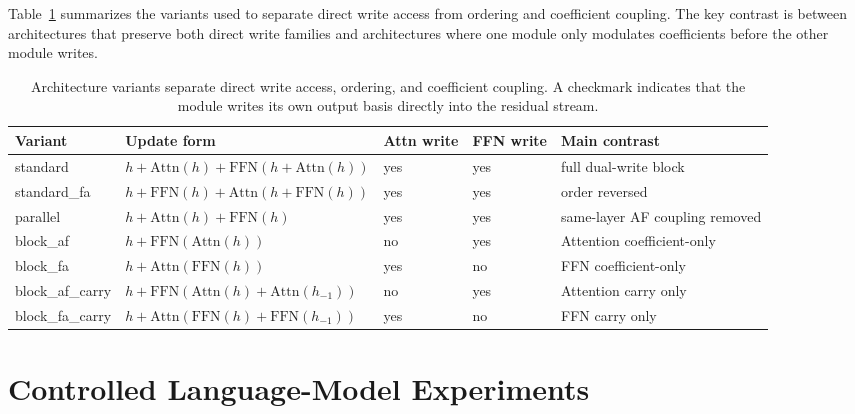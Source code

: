 \documentclass[letterpaper]{article}
\newcommand{\Attn}{\mathrm{Attn}}
\newcommand{\FFN}{\mathrm{FFN}}
\begin{document}
Table~\ref{tab:variants} summarizes the variants used to separate direct write
access from ordering and coefficient coupling. The key contrast is between
architectures that preserve both direct write families and architectures where
one module only modulates coefficients before the other module writes.

\begin{table}[t]
\centering
\caption{Architecture variants separate direct write access, ordering, and
coefficient coupling. A checkmark indicates that the module writes its own
output basis directly into the residual stream.}
\label{tab:variants}
\begin{tabular}{lllll}
\toprule
Variant & Update form & Attn write & FFN write & Main contrast \\
\midrule
standard & $h+\Attn(h)+\FFN(h+\Attn(h))$ & yes & yes & full dual-write block \\
standard\_fa & $h+\FFN(h)+\Attn(h+\FFN(h))$ & yes & yes & order reversed \\
parallel & $h+\Attn(h)+\FFN(h)$ & yes & yes & same-layer AF coupling removed \\
block\_af & $h+\FFN(\Attn(h))$ & no & yes & Attention coefficient-only \\
block\_fa & $h+\Attn(\FFN(h))$ & yes & no & FFN coefficient-only \\
block\_af\_carry & $h+\FFN(\Attn(h)+\Attn(h_{-1}))$ & no & yes & Attention carry only \\
block\_fa\_carry & $h+\Attn(\FFN(h)+\FFN(h_{-1}))$ & yes & no & FFN carry only \\
\bottomrule
\end{tabular}
\end{table}

\section{Controlled Language-Model Experiments}
\end{document}
